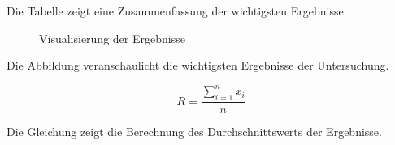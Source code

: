 Die Tabelle zeigt eine Zusammenfassung der wichtigsten Ergebnisse.

\begin{figure}[htbp]
\centering
\caption{Visualisierung der Ergebnisse}
\label{fig:ergebnisse}
\end{figure}

Die Abbildung veranschaulicht die wichtigsten Ergebnisse der Untersuchung.

\begin{equation}
\label{eq:ergebnis}
R = \frac{\sum_{i=1}^{n} x_i}{n}
\end{equation}

Die Gleichung zeigt die Berechnung des Durchschnittswerts der Ergebnisse.

